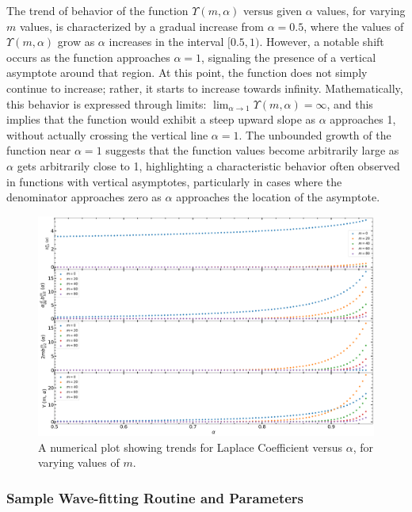 \documentclass{article}
\begin{document}
The trend of behavior of the function $\Upsilon(m,\alpha)$ versus given $\alpha$ values, for varying $m$ values, is characterized by a gradual increase from $\alpha =0.5$, where the values of $\Upsilon(m,\alpha)$  grow as $\alpha$ increases in the interval \([0.5, 1)\). However, a notable shift occurs as the function approaches \(\alpha=1\), signaling the presence of a vertical asymptote around that region. At this point, the function does not simply continue to increase; rather, it starts to increase towards infinity. Mathematically, this behavior is expressed through limits: $\lim_{{\alpha \to 1}} \Upsilon(m,\alpha) = \infty$, and this implies that the function would exhibit a steep upward slope as $\alpha$ approaches 1, without actually crossing the vertical line $\alpha=1$. The unbounded growth of the function near $\alpha=1$ suggests that the function values become arbitrarily large as $\alpha$ gets arbitrarily close to 1, highlighting a characteristic behavior often observed in functions with vertical asymptotes, particularly in cases where the denominator approaches zero as $\alpha$ approaches the location of the asymptote. 

\begin{figure}
    \centering
    \includegraphics[width=1\linewidth]{laplace_coefficients_for_different_mvalues.png}
    \caption{A numerical plot showing trends for Laplace Coefficient versus $\alpha$, for varying values of $m$.}
    \label{fig:enter-label}
\end{figure}


\subsubsection{Sample Wave-fitting Routine and Parameters}
\end{document}
